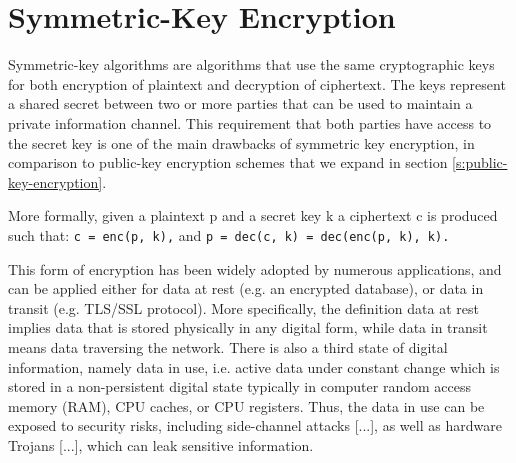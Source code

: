 \section{Symmetric-Key Encryption}\label{s:symmetric-key-encryption}
Symmetric-key algorithms are algorithms that use the same cryptographic keys for both encryption of plaintext and decryption of ciphertext.
The keys represent a shared secret between two or more parties that can be used to maintain a private information channel.
This requirement that both parties have access to the secret key is one of the main drawbacks of symmetric key encryption, in comparison to public-key encryption schemes that we expand in section \ref{s:public-key-encryption}.

More formally, given a plaintext p and a secret key k a ciphertext c is produced such that:
\texttt{c = enc(p, k),} and \texttt{p = dec(c, k) = dec(enc(p, k), k).}


This form of encryption has been widely adopted by numerous applications, and can be applied either for data at rest (e.g. an encrypted database), or data in transit (e.g. TLS/SSL protocol).
More specifically, the definition data at rest implies data that is stored physically in any digital form, while data in transit means data traversing the network.
There is also a third state of digital information, namely data in use, i.e. active data under constant change which is stored in a non-persistent digital state typically in computer random access memory (RAM), CPU caches, or CPU registers.
Thus, the data in use can be exposed to security risks, including side-channel attacks [...], as well as hardware Trojans [...], which can leak sensitive information.
